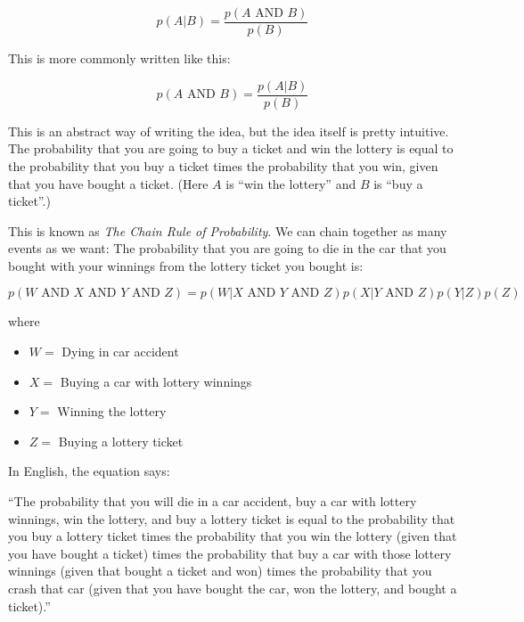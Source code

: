$$p(A | B) = \frac{p(A \text{ AND } B)}{p(B)}$$

This is more commonly written like this:

$$p(A \text{ AND } B) = \frac{p(A | B)}{p(B)}$$

This is an abstract way of writing the idea, but the idea itself
is pretty intuitive. The probability that you are going to buy a ticket
and win the lottery is equal to the probability that you buy a ticket
times the probability that you win, given that you have bought a ticket.
(Here $A$ is ``win the lottery'' and $B$ is ``buy a ticket''.)

This is known as \textit{The Chain Rule of Probability}.  We can
chain together as many events as we want: The probability that you are
going to die in the car that you bought with your winnings from the
lottery ticket you bought is:

$$p(W \text{ AND } X \text{ AND } Y \text{ AND } Z) = p( W | X \text{ AND } Y \text{ AND } Z) p( X |  Y \text{ AND } Z) p (Y | Z) p(Z)$$

where

\begin{itemize}
\item $W =$ Dying in car accident
\item $X =$ Buying a car with lottery winnings
\item $Y =$ Winning the lottery
\item $Z =$ Buying a lottery ticket
\end{itemize}

In English, the equation says:

``The probability that you will die in a car accident, buy a car with
lottery winnings, win the lottery, and buy a lottery ticket is equal
to the probability that you buy a lottery ticket times the probability
that you win the lottery (given that you have bought a ticket) times
the probability that buy a car with those lottery winnings (given that
bought a ticket and won) times the probability that you crash that car
(given that you have bought the car, won the lottery, and bought a
ticket).''



  
